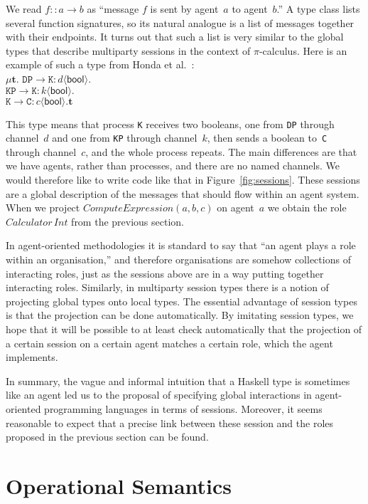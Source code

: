 \documentclass[a4paper,12pt,oneside,fleqn]{book} %
\begin{document}
{\def\l#1->#2:#3<#4>{\mathtt{#1}\to\mathtt{#2}:#3\langle\mathsf{#4}\rangle}
We read $f::a\to b$ as ``message $f$ is sent by agent~$a$ to agent~$b$.'' A
type class lists several function signatures, so its natural analogue is a
list of messages together with their endpoints. It turns out that such a
list is very similar to the global types that describe multiparty sessions
in the context of $\pi$-calculus. Here is an example of such a type from
Honda et al.~\cite{dblp:conf/popl/hondayc08}:\\
$\mu\mathbf{t}.$
  $\l DP->K:d<bool>. $\\
  $\l KP->K:k<bool>. $\\
  $\l K->C:c<bool>.\mathbf{t}$

This type means that process \texttt{K} receives two booleans, one from
\texttt{DP} through channel~$d$ and one from \texttt{KP} through channel~$k$,
then sends a boolean to~\texttt{C} through channel~$c$, and the whole process
repeats. The main differences are that we have agents, rather than processes,
and there are no named channels. We would therefore like to write code like
that in Figure~\ref{fig:sessions}.  These sessions are a global description of
the messages that should flow within an agent system. When we project
$\mathit{ComputeExpression}(a,b,c)$ on agent~$a$ we obtain the role
$\mathit{Calculator}\,\mathit{Int}$ from the previous section.}

In agent-oriented methodologies it is standard to say that ``an agent plays
a role within an organisation,'' and therefore organisations are somehow
collections of interacting roles, just as the sessions above are in a way
putting together interacting roles. Similarly, in multiparty session types
there is a notion of projecting global types onto local types. The
essential advantage of session types is that the projection can be done
automatically. By imitating session types, we hope that it will be possible
to at least check automatically that the projection of a certain session on
a certain agent matches a certain role, which the agent implements.

In summary, the vague and informal intuition that a Haskell type is
sometimes like an agent led us to the proposal of specifying global
interactions in agent-oriented programming languages in terms of sessions.
Moreover, it seems reasonable to expect that a precise link between these
session and the roles proposed in the previous section can be found.

\section{Operational Semantics}\label{sec:opsem} %
\end{document}
